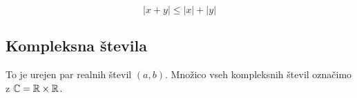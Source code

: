 
\[
	\left|x+y\right| \le \left|x\right| + \left|y\right|
\]

\subsection{Kompleksna števila}


To je urejen par realnih števil $(a,b)$. Množico vseh kompleksnih števil označimo z $\mathbb{C} = \mathbb{R} \times \mathbb{R}$.

